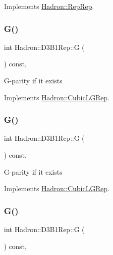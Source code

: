 Implements \mbox{\hyperlink{structHadron_1_1RepRep_a92c8802e5ed7afd7da43ccfd5b7cd92b}{Hadron\+::\+Rep\+Rep}}.

\mbox{\label{structHadron_1_1D3B1Rep_ab5d7b0b93b53bf87f919f365d0d8cc4e}} 
\subsubsection{\texorpdfstring{G()}{G()}\hspace{0.1cm}{\footnotesize\ttfamily [1/3]}}
{\footnotesize\ttfamily int Hadron\+::\+D3\+B1\+Rep\+::G (\begin{DoxyParamCaption}{ }\end{DoxyParamCaption}) const\hspace{0.3cm}{\ttfamily [inline]}, {\ttfamily [virtual]}}

G-\/parity if it exists 

Implements \mbox{\hyperlink{structHadron_1_1CubicLGRep_ace26f7b2d55e3a668a14cb9026da5231}{Hadron\+::\+Cubic\+L\+G\+Rep}}.

\mbox{\label{structHadron_1_1D3B1Rep_ab5d7b0b93b53bf87f919f365d0d8cc4e}} 
\subsubsection{\texorpdfstring{G()}{G()}\hspace{0.1cm}{\footnotesize\ttfamily [2/3]}}
{\footnotesize\ttfamily int Hadron\+::\+D3\+B1\+Rep\+::G (\begin{DoxyParamCaption}{ }\end{DoxyParamCaption}) const\hspace{0.3cm}{\ttfamily [inline]}, {\ttfamily [virtual]}}

G-\/parity if it exists 

Implements \mbox{\hyperlink{structHadron_1_1CubicLGRep_ace26f7b2d55e3a668a14cb9026da5231}{Hadron\+::\+Cubic\+L\+G\+Rep}}.

\mbox{\label{structHadron_1_1D3B1Rep_ab5d7b0b93b53bf87f919f365d0d8cc4e}} 
\subsubsection{\texorpdfstring{G()}{G()}\hspace{0.1cm}{\footnotesize\ttfamily [3/3]}}
{\footnotesize\ttfamily int Hadron\+::\+D3\+B1\+Rep\+::G (\begin{DoxyParamCaption}{ }\end{DoxyParamCaption}) const\hspace{0.3cm}{\ttfamily [inline]}, {\ttfamily [virtual]}}

